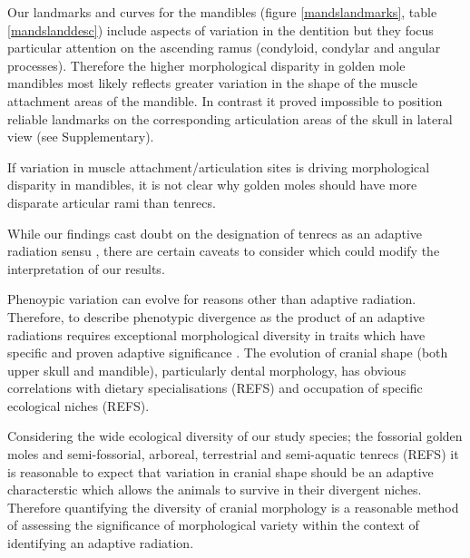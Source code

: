 \documentclass[12pt,a4paper]{article}
\begin{document}
Our landmarks and curves for the mandibles (figure \ref{mandslandmarks}, table \ref{mandslanddesc}) include aspects of variation in the dentition but they focus particular attention on the ascending ramus (condyloid, condylar and angular processes). Therefore the higher morphological disparity in golden mole mandibles most likely reflects greater variation in the shape of the muscle attachment areas of the mandible. In contrast it proved impossible to position reliable landmarks on the corresponding articulation areas of the skull in lateral view (see Supplementary).

If variation in muscle attachment/articulation sites is driving morphological disparity in mandibles, it is not clear why golden moles should have more disparate articular rami than tenrecs. 

 


While our findings cast doubt on the designation of tenrecs as an adaptive radiation sensu \citep{Losos2010a}, there are certain caveats to consider which could modify the interpretation of our results.

Phenoypic variation can evolve for reasons other than adaptive radiation. Therefore, to describe phenotypic divergence as the product of an adaptive radiations requires exceptional morphological diversity in traits which have specific and proven adaptive significance \citep{Losos2010a}. The evolution of cranial shape (both upper skull and mandible), particularly dental morphology, has obvious correlations with dietary specialisations (REFS) and occupation of specific ecological niches (REFS). 


Considering the wide ecological diversity of our study species; the fossorial golden moles and semi-fossorial, arboreal, terrestrial and semi-aquatic tenrecs (REFS) it is reasonable to expect that variation in cranial shape should be an adaptive characterstic which allows the animals to survive in their divergent niches. Therefore quantifying the diversity of cranial morphology is a reasonable method of assessing the significance of morphological variety within the context of identifying an adaptive radiation.
\end{document}
